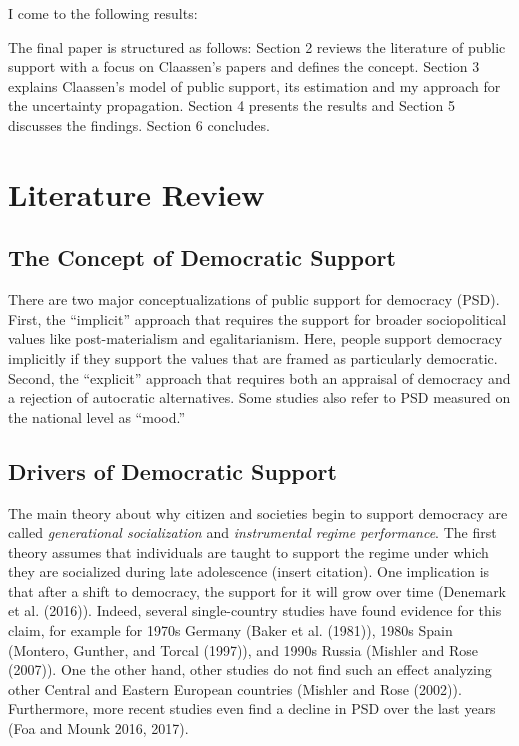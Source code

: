 \documentclass[12pt,english,a4paper,oneside]{article}
\theoremstyle{definition}
\theoremstyle{definition}
\theoremstyle{definition}
\theoremstyle{definition}
\theoremstyle{remark}
\begin{document}
I come to the following results:

The final paper is structured as follows: Section 2 reviews the literature of public support with a focus on Claassen's papers and defines the concept. Section 3 explains Claassen's model of public support, its estimation and my approach for the uncertainty propagation. Section 4 presents the results and Section 5 discusses the findings. Section 6 concludes.

\hypertarget{literature-review}{%
\section{Literature Review}\label{literature-review}}

\hypertarget{the-concept-of-democratic-support}{%
\subsection{The Concept of Democratic Support}\label{the-concept-of-democratic-support}}

There are two major conceptualizations of public support for democracy (PSD). First, the \enquote{implicit} approach that requires the support for broader sociopolitical values like post-materialism and egalitarianism. Here, people support democracy implicitly if they support the values that are framed as particularly democratic. Second, the \enquote{explicit} approach that requires both an appraisal of democracy and a rejection of autocratic alternatives. Some studies also refer to PSD measured on the national level as \enquote{mood.}

\hypertarget{drivers-of-democratic-support}{%
\subsection{Drivers of Democratic Support}\label{drivers-of-democratic-support}}

The main theory about why citizen and societies begin to support democracy are called \emph{generational socialization} and \emph{instrumental regime performance}. The first theory assumes that individuals are taught to support the regime under which they are socialized during late adolescence (insert citation). One implication is that after a shift to democracy, the support for it will grow over time (Denemark et al. (2016)). Indeed, several single-country studies have found evidence for this claim, for example for 1970s Germany (Baker et al. (1981)), 1980s Spain (Montero, Gunther, and Torcal (1997)), and 1990s Russia (Mishler and Rose (2007)). One the other hand, other studies do not find such an effect analyzing other Central and Eastern European countries (Mishler and Rose (2002)). Furthermore, more recent studies even find a decline in PSD over the last years (Foa and Mounk 2016, 2017).
\end{document}
